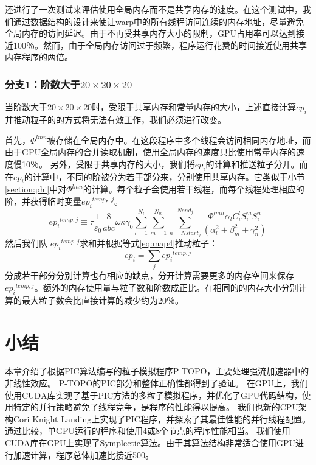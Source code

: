 还进行了一次测试来评估使用全局内存而不是共享内存的速度。在这个测试中，我们通过数据结构的设计来使让warp中的所有线程访问连续的内存地址，尽量避免全局内存的访问延迟。由于不再受共享内存大小的限制，GPU占用率可以达到接近100％。然而，由于全局内存访问过于频繁，程序运行花费的时间接近使用共享内存程序的两倍。

\subsubsection{分支1：阶数大于$20 \times 20 \times 20$}
当阶数大于$20 \times 20 \times 20$时，受限于共享内存和常量内存的大小，上述直接计算$ep_ {i}$并推动粒子的的方式将无法有效工作，我们必须进行改变。

首先，$\Phi^{lmn}$被存储在全局内存中。在这段程序中多个线程会访问相同内存地址，而由于GPU全局内存的合并读取机制，使用全局内存的速度只比使用常量内存的速度慢10％。
另外，受限于共享内存的大小，我们将$ ep_{i} $的计算和推送粒子分开。而在$ ep_{i} $的计算中，不同的阶被分为若干部分来，分别使用共享内存。它类似于小节 \ref{section:phi}中对$\Phi^{lmn}$的计算。每个粒子会使用若干线程，而每个线程处理相应的阶，并获得临时变量${e{{p}_{i}}^{temp，j}}$。
\begin{equation}
{e{{p}_{i}}^{temp,j}}\equiv \tau \frac{1}{{{\varepsilon }_{0}}}\frac{8}{abc}\omega \kappa {{\gamma }_{0}}\sum\limits_{l=1}^{{{N}_{l}}}{\sum\limits_{m=1}^{{{N}_{m}}}{\sum\limits_{n=Nstar{{t}_{j}}}^{Nen{{d}_{j}}}{\frac{\Phi^{lmn}{{\alpha }_{l}}C_{i}^{l}S_{i}^{m}S_{i}^{n}}{(\alpha _{l}^{2}+\beta _{m}^{2}+\gamma _{n}^{2})}}}}
\end{equation}
然后我们队 ${e{{p}_{i}}^{temp,j}}$求和并根据等式\ref{eq:map4}推动粒子：
\begin{equation}
e{{p}_{i}}=\sum\limits_{j}{e{{p}_{i}}^{temp,j}}
\end{equation}
分成若干部分分别计算也有相应的缺点，分开计算需要更多的内存空间来保存~${e{{p}_{i}}^{temp,j}}$。额外的内存使用量与粒子数和阶数成正比。在相同的的内存大小分别计算的最大粒子数会比直接计算的减少约为20％。

\section{小结}                            \label{section:Code_conclusion}
本章介绍了根据PIC算法编写的粒子模拟程序P-TOPO，主要处理强流加速器中的非线性效应。
P-TOPO的PIC部分和整体正确性都得到了验证。
在GPU上，我们使用CUDA库实现了基于PIC方法的多粒子模拟程序，并优化了GPU代码结构，使用特定的并行策略避免了线程竞争，是程序的性能得以提高。
我们也新的CPU架构Cori Knight Landing上实现了PIC程序，并探索了其最佳性能的并行线程配置。通过比较，单GPU运行的程序和使用4或8个节点的程序性能相当。
我们使用CUDA库在GPU上实现了Symplectic算法。由于其算法结构非常适合使用GPU进行加速计算，程序总体加速比接近500。
